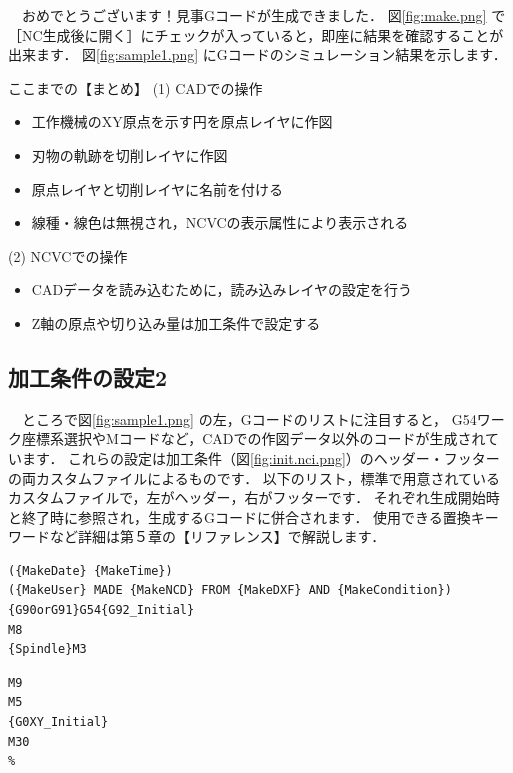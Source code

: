 　おめでとうございます！見事Gコードが生成できました．
図\ref{fig:make.png} で［NC生成後に開く］にチェックが入っていると，即座に結果を確認することが出来ます．
図\ref{fig:sample1.png} にGコードのシミュレーション結果を示します．

\vspace*{3zh}
\begin{itembox}[l]{ここまでの【まとめ】}
(1) CADでの操作
\begin{itemize}
\item 工作機械のXY原点を示す円を原点レイヤに作図
\item 刃物の軌跡を切削レイヤに作図
\item 原点レイヤと切削レイヤに名前を付ける
\item 線種・線色は無視され，NCVCの表示属性により表示される
\end{itemize}
(2) NCVCでの操作
\begin{itemize}
\item CADデータを読み込むために，読み込みレイヤの設定を行う
\item Z軸の原点や切り込み量は加工条件で設定する
\end{itemize}
\end{itembox}

\newpage
\subsection{加工条件の設定2}
\label{sec:init2.nci}

　ところで図\ref{fig:sample1.png} の左，Gコードのリストに注目すると，
G54ワーク座標系選択やMコードなど，CADでの作図データ以外のコードが生成されています．
これらの設定は加工条件（図\ref{fig:init.nci.png}）のヘッダー・フッターの両カスタムファイルによるものです．
以下のリスト，標準で用意されているカスタムファイルで，左がヘッダー，右がフッターです．
それぞれ生成開始時と終了時に参照され，生成するGコードに併合されます．
使用できる置換キーワードなど詳細は第５章の【リファレンス】で解説します．

\begin{minipage}[t]{0.75\textwidth}
\begin{lstlisting}[caption=Header.txt,numbers=none,label=lst:header.txt]
%
({MakeDate} {MakeTime})
({MakeUser} MADE {MakeNCD} FROM {MakeDXF} AND {MakeCondition})
{G90orG91}G54{G92_Initial}
M8
{Spindle}M3
\end{lstlisting}
\end{minipage}
\begin{minipage}[t]{0.25\textwidth}
\begin{lstlisting}[caption=Footer.txt,numbers=none,label=lst:footer.txt]
M9
M5
{G0XY_Initial}
M30
%
\end{lstlisting}
\end{minipage}

